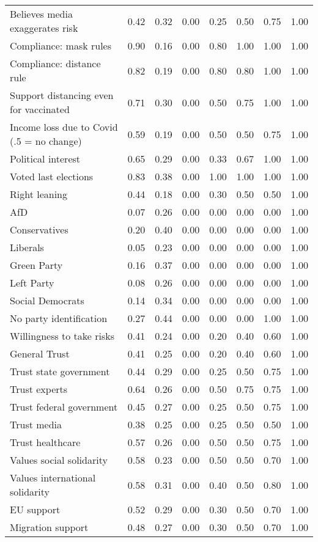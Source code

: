 \begin{table}
{\begin{tabular}[t]{lrrrrrrr}
Believes media exaggerates risk & 0.42 & 0.32 & 0.00 & 0.25 & 0.50 & 0.75 & 1.00\\
Compliance: mask rules & 0.90 & 0.16 & 0.00 & 0.80 & 1.00 & 1.00 & 1.00\\
Compliance: distance rule & 0.82 & 0.19 & 0.00 & 0.80 & 0.80 & 1.00 & 1.00\\
Support distancing even for vaccinated & 0.71 & 0.30 & 0.00 & 0.50 & 0.75 & 1.00 & 1.00\\
Income loss due to Covid (.5 = no change) & 0.59 & 0.19 & 0.00 & 0.50 & 0.50 & 0.75 & 1.00\\
Political interest & 0.65 & 0.29 & 0.00 & 0.33 & 0.67 & 1.00 & 1.00\\
Voted last elections & 0.83 & 0.38 & 0.00 & 1.00 & 1.00 & 1.00 & 1.00\\
Right leaning & 0.44 & 0.18 & 0.00 & 0.30 & 0.50 & 0.50 & 1.00\\
AfD & 0.07 & 0.26 & 0.00 & 0.00 & 0.00 & 0.00 & 1.00\\
Conservatives & 0.20 & 0.40 & 0.00 & 0.00 & 0.00 & 0.00 & 1.00\\
Liberals & 0.05 & 0.23 & 0.00 & 0.00 & 0.00 & 0.00 & 1.00\\
Green Party & 0.16 & 0.37 & 0.00 & 0.00 & 0.00 & 0.00 & 1.00\\
Left Party & 0.08 & 0.26 & 0.00 & 0.00 & 0.00 & 0.00 & 1.00\\
Social Democrats & 0.14 & 0.34 & 0.00 & 0.00 & 0.00 & 0.00 & 1.00\\
No party identification & 0.27 & 0.44 & 0.00 & 0.00 & 0.00 & 1.00 & 1.00\\
Willingness to take risks & 0.41 & 0.24 & 0.00 & 0.20 & 0.40 & 0.60 & 1.00\\
General Trust & 0.41 & 0.25 & 0.00 & 0.20 & 0.40 & 0.60 & 1.00\\
Trust state government & 0.44 & 0.29 & 0.00 & 0.25 & 0.50 & 0.75 & 1.00\\
Trust experts & 0.64 & 0.26 & 0.00 & 0.50 & 0.75 & 0.75 & 1.00\\
Trust federal government & 0.45 & 0.27 & 0.00 & 0.25 & 0.50 & 0.75 & 1.00\\
Trust media & 0.38 & 0.25 & 0.00 & 0.25 & 0.50 & 0.50 & 1.00\\
Trust healthcare & 0.57 & 0.26 & 0.00 & 0.50 & 0.50 & 0.75 & 1.00\\
Values social solidarity & 0.58 & 0.23 & 0.00 & 0.50 & 0.50 & 0.70 & 1.00\\
Values international solidarity & 0.58 & 0.31 & 0.00 & 0.40 & 0.50 & 0.80 & 1.00\\
EU support & 0.52 & 0.29 & 0.00 & 0.30 & 0.50 & 0.70 & 1.00\\
Migration support & 0.48 & 0.27 & 0.00 & 0.30 & 0.50 & 0.70 & 1.00\\
\bottomrule
\end{tabular}}
\end{table}
